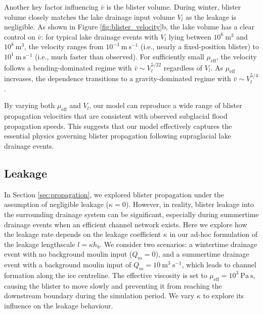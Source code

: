 \documentclass[draft]{agujournal2019}
\newcommand{\secref}[1]{Section \ref{#1}}
\newcommand{\figref}[1]{Figure \ref{#1}}
\begin{document}
Another key factor influencing $\bar{v}$ is the blister volume. During winter, blister volume closely matches the lake drainage input volume $V_l$ as the leakage is negligible. As shown in \figref{fig:blister_velocity}b, the lake volume has a clear control on $\bar{v}$: for typical lake drainage events with $V_l$ lying between $10^{6}~\text{m}^3$ and $10^{8}~\text{m}^3$, the velocity ranges from $10^{-3}~\text{m}~\text{s}^{-1}$ (i.e., nearly a fixed-position blister) to $10^{1}~\text{m}~\text{s}^{-1}$ (i.e., much faster than observed). For sufficiently small $\mu_{\text{eff}}$, the velocity follows a bending-dominated regime with $\bar{v}\sim V_l^{5/22}$ regardless of $V_l$. As $\mu_{\text{eff}}$ increases, the dependence transitions to a gravity-dominated regime with $\bar{v}\sim V_l^{5/4}$. 

By varying both $\mu_{\text{eff}}$ and $V_l$, our model can reproduce a wide range of blister propagation velocities that are consistent with observed subglacial flood propagation speeds. This suggests that our model effectively captures the essential physics governing blister propagation following supraglacial lake drainage events.

\subsection{Leakage}
In \secref{sec:propagation}, we explored blister propagation under the assumption of negligible leakage ($\kappa=0$). However, in reality, blister leakage into the surrounding drainage system can be significant, especially during summertime drainage events when an efficient channel network exists. Here we explore how the leakage rate depends on the leakage coefficient $\kappa$ in our ad-hoc formulation of the leakage lengthscale $l=\kappa h_b$. We consider two scenarios: a wintertime drainage event with no background moulin input ($Q_m=0$), and a summertime drainage event with a background moulin input of $Q_m=10~\text{m}^3~\text{s}^{-1}$, which leads to channel formation along the ice centreline. The effective viscosity is set to $\mu_{\text{eff}}=10^3~\text{Pa}~\text{s}$, causing the blister to move slowly and preventing it from reaching the downstream boundary during the simulation period. We vary $\kappa$ to explore its influence on the leakage behaviour.
\end{document}
